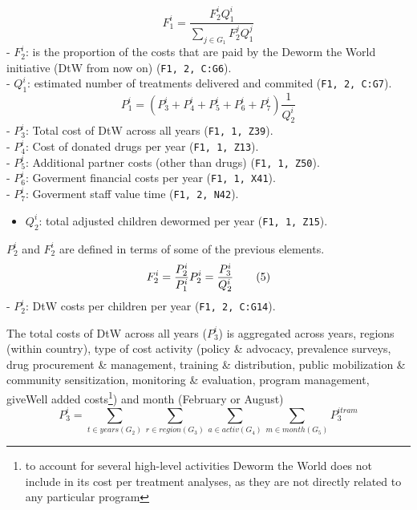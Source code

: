 \documentclass[]{article}
\providecommand{\tightlist}{%
  \setlength{\itemsep}{0pt}\setlength{\parskip}{0pt}}
\let\rmarkdownfootnote\footnote%
\def\footnote{\protect\rmarkdownfootnote}
\begin{document}
\[
\begin{equation}
F^{i}_{1} = \frac{F^{i}_{2} Q^{i}_{1}}{\sum_{j \in G_{1}} F^{j}_{2} Q^{j}_{1}}
\label{eq:3}
\tag{3}
\end{equation}
\] - \(F^{i}_{2}\): is the proportion of the costs that are paid by the
Deworm the World initiative (DtW from now on)
(\texttt{F1,\ 2,\ C:G6}).\\
- \(Q^{i}_{1}\): estimated number of treatments delivered and commited
(\texttt{F1,\ 2,\ C:G7}).\\
\[
\begin{equation}
P^{i}_{1} = \left(P^{i}_{3} + P^{i}_{4} + P^{i}_{5} + P^{i}_{6} + P^{i}_{7}  \right)\frac{1}{Q^{i}_{2}}
\label{eq:4}
\tag{4}
\end{equation}
\] - \(P^{i}_{3}\): Total cost of DtW across all years
(\texttt{F1,\ 1,\ Z39}).\\
- \(P^{i}_{4}\): Cost of donated drugs per year
(\texttt{F1,\ 1,\ Z13}).\\
- \(P^{i}_{5}\): Additional partner costs (other than drugs)
(\texttt{F1,\ 1,\ Z50}).\\
- \(P^{i}_{6}\): Goverment financial costs per year
(\texttt{F1,\ 1,\ X41}).\\
- \(P^{i}_{7}\): Goverment staff value time (\texttt{F1,\ 2,\ N42}).

\begin{itemize}
\tightlist
\item
  \(Q^{i}_{2}\): total adjusted children dewormed per year
  (\texttt{F1,\ 1,\ Z15}).
\end{itemize}

\(P^{i}_{2}\) and \(F^{i}_{2}\) are defined in terms of some of the
previous elements. \[
\begin{equation}
F^{i}_{2} = \frac{P^{i}_{2}}{P^{i}_{1}}\\
P^{i}_{2} = \frac{P^{i}_{3}}{Q^{i}_{2}}
\label{eq:5}
\tag{5}
\end{equation}
\] - \(P^{i}_{2}\): DtW costs per children per year
(\texttt{F1,\ 2,\ C:G14}).

The total costs of DtW across all years (\(P^{i}_{3}\)) is aggregated
across years, regions (within country), type of cost activity (policy \&
advocacy, prevalence surveys, drug procurement \& management, training
\& distribution, public mobilization \& community sensitization,
monitoring \& evaluation, program management, giveWell added
costs\footnote{to account for several high-level activities Deworm the
  World does not include in its cost per treatment analyses, as they are
  not directly related to any particular program}) and month (February
or August) \[
\begin{equation}
P^{i}_{3} = \sum_{t \in years (G_{2})} 
\sum_{r \in region (G_{3})} 
\sum_{a \in activ (G_{4})} 
\sum_{m \in month (G_{5})} P^{itram}_{3}
\label{eq:6}
\tag{6}
\end{equation}
\]
\end{document}
